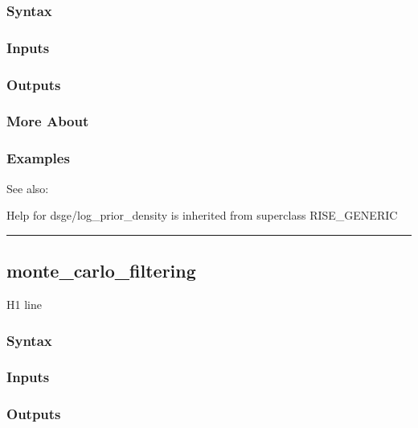 \documentclass[letterpaper,10pt,english]{sphinxmanual}
\begin{document}
\subsubsection{Syntax}
\label{classes/models/@dsge/dsge:id99}

\subsubsection{Inputs}
\label{classes/models/@dsge/dsge:id100}

\subsubsection{Outputs}
\label{classes/models/@dsge/dsge:id101}

\subsubsection{More About}
\label{classes/models/@dsge/dsge:id102}

\subsubsection{Examples}
\label{classes/models/@dsge/dsge:id103}
See also:

Help for dsge/log\_prior\_density is inherited from superclass RISE\_GENERIC


\bigskip\hrule{}\bigskip



\subsection{monte\_carlo\_filtering}
\label{classes/models/@dsge/dsge:monte-carlo-filtering}\label{classes/models/@dsge/dsge:id104}
H1 line


\subsubsection{Syntax}
\label{classes/models/@dsge/dsge:id105}

\subsubsection{Inputs}
\label{classes/models/@dsge/dsge:id106}

\subsubsection{Outputs}
\label{classes/models/@dsge/dsge:id107}
\end{document}
